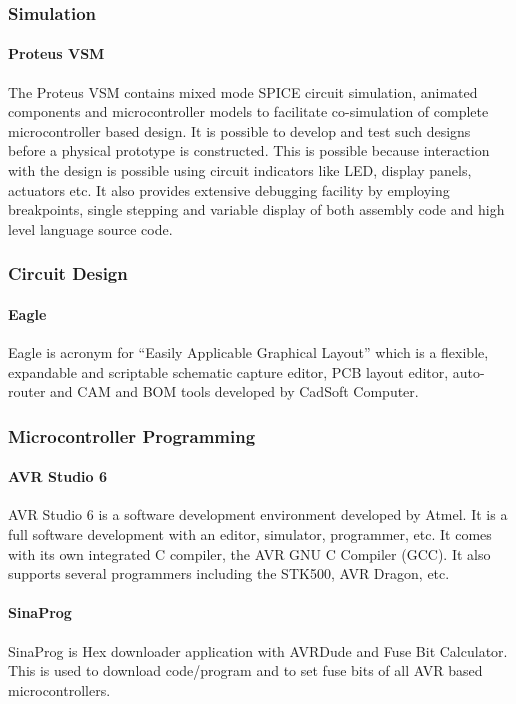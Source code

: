 \documentclass[12pt, a4paper]{article}
\begin{document}
\subsubsection{Simulation}
\paragraph {Proteus VSM}
The Proteus VSM contains mixed mode SPICE circuit simulation, animated components and microcontroller models to facilitate co-simulation of complete microcontroller based design. It is possible to develop and test such designs before a physical prototype is constructed. This is possible because interaction with the design is possible using circuit indicators like LED, display panels, actuators etc. It also provides extensive debugging facility by employing breakpoints, single stepping and variable display of both assembly code and high level language source code.

\subsubsection{Circuit Design}
\paragraph{Eagle}
Eagle is acronym for “Easily Applicable Graphical Layout” which is a flexible, expandable and scriptable schematic capture editor, PCB layout editor, auto-router and CAM and BOM tools developed by CadSoft Computer. 

\subsubsection{Microcontroller Programming}
\paragraph {AVR Studio 6}
AVR Studio 6 is a software development environment developed by Atmel. It is a full software development with an editor, simulator, programmer, etc. It comes with its own integrated C compiler, the AVR GNU C Compiler (GCC). It also supports several programmers including the STK500, AVR Dragon, etc. 

\paragraph{SinaProg}
SinaProg is Hex downloader application with AVRDude and Fuse Bit Calculator. This is used to download code/program and to set fuse bits of all AVR based microcontrollers. 
\end{document}

